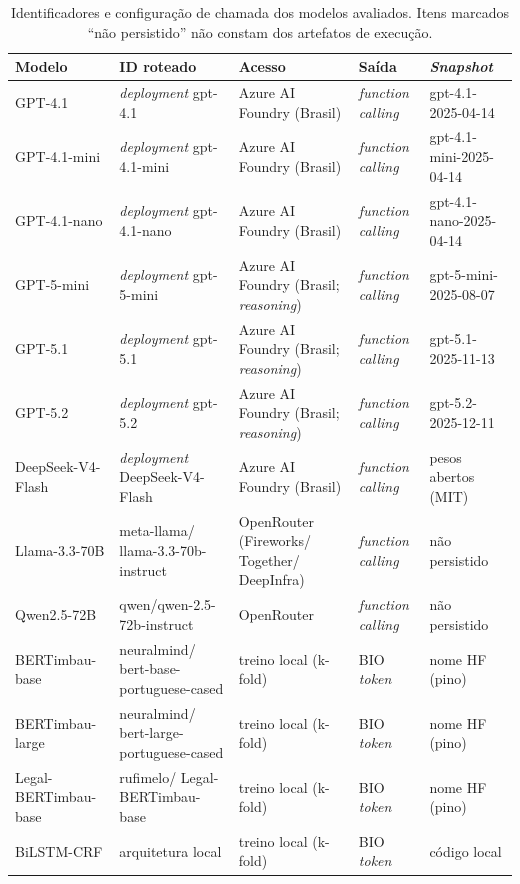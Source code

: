 \begin{table}[ht]
    \centering
    \caption{Identificadores e configuração de chamada dos modelos avaliados. Itens marcados ``não persistido'' não constam dos artefatos de execução.}
    \label{tab:reprodutibilidade_modelos}
    \scriptsize
    \setlength{\tabcolsep}{4pt}
    \begin{tabular}{
        >{\raggedright\arraybackslash}p{2.3cm}
        >{\raggedright\arraybackslash}p{3.0cm}
        >{\raggedright\arraybackslash}p{3.0cm}
        >{\raggedright\arraybackslash}p{1.6cm}
        >{\raggedright\arraybackslash}p{2.6cm}
    }
        \toprule
        \textbf{Modelo} & \textbf{ID roteado} & \textbf{Acesso} & \textbf{Saída} & \textbf{\textit{Snapshot}} \\
        \midrule
        GPT-4.1 & \textit{deployment} gpt-4.1 & Azure AI Foundry (Brasil) & \textit{function calling} & gpt-4.1-2025-04-14 \\
        GPT-4.1-mini & \textit{deployment} gpt-4.1-mini & Azure AI Foundry (Brasil) & \textit{function calling} & gpt-4.1-mini-2025-04-14 \\
        GPT-4.1-nano & \textit{deployment} gpt-4.1-nano & Azure AI Foundry (Brasil) & \textit{function calling} & gpt-4.1-nano-2025-04-14 \\
        GPT-5-mini & \textit{deployment} gpt-5-mini & Azure AI Foundry (Brasil; \textit{reasoning}) & \textit{function calling} & gpt-5-mini-2025-08-07 \\
        GPT-5.1 & \textit{deployment} gpt-5.1 & Azure AI Foundry (Brasil; \textit{reasoning}) & \textit{function calling} & gpt-5.1-2025-11-13 \\
        GPT-5.2 & \textit{deployment} gpt-5.2 & Azure AI Foundry (Brasil; \textit{reasoning}) & \textit{function calling} & gpt-5.2-2025-12-11 \\
        DeepSeek-V4-Flash & \textit{deployment} DeepSeek-V4-Flash & Azure AI Foundry (Brasil) & \textit{function calling} & pesos abertos (MIT) \\
        Llama-3.3-70B & meta-llama/ llama-3.3-70b-instruct & OpenRouter (Fireworks/ Together/ DeepInfra) & \textit{function calling} & não persistido \\
        Qwen2.5-72B & qwen/qwen-2.5-72b-instruct & OpenRouter & \textit{function calling} & não persistido \\
        BERTimbau-base & neuralmind/ bert-base-portuguese-cased & treino local (k-fold) & BIO \textit{token} & nome HF (pino) \\
        BERTimbau-large & neuralmind/ bert-large-portuguese-cased & treino local (k-fold) & BIO \textit{token} & nome HF (pino) \\
        Legal-BERTimbau-base & rufimelo/ Legal-BERTimbau-base & treino local (k-fold) & BIO \textit{token} & nome HF (pino) \\
        BiLSTM-CRF & arquitetura local & treino local (k-fold) & BIO \textit{token} & código local \\
        \bottomrule
    \end{tabular}
\end{table}

